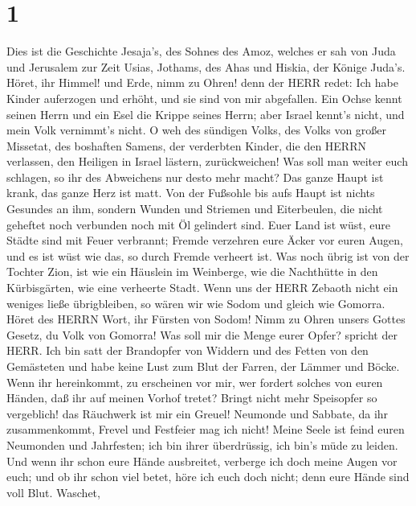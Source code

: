 \hypertarget{section}{%
\section{1}\label{section}}

 Dies ist die Geschichte Jesaja's, des Sohnes des Amoz,
welches er sah von Juda und Jerusalem zur Zeit Usias, Jothams, des Ahas
und Hiskia, der Könige Juda's.  Höret, ihr Himmel! und Erde,
nimm zu Ohren! denn der HERR redet: Ich habe Kinder auferzogen und
erhöht, und sie sind von mir abgefallen.  Ein Ochse kennt
seinen Herrn und ein Esel die Krippe seines Herrn; aber Israel kennt's
nicht, und mein Volk vernimmt's nicht.  O weh des sündigen
Volks, des Volks von großer Missetat, des boshaften Samens, der
verderbten Kinder, die den HERRN verlassen, den Heiligen in Israel
lästern, zurückweichen!  Was soll man weiter euch schlagen,
so ihr des Abweichens nur desto mehr macht? Das ganze Haupt ist krank,
das ganze Herz ist matt.  Von der Fußsohle bis aufs Haupt
ist nichts Gesundes an ihm, sondern Wunden und Striemen und Eiterbeulen,
die nicht geheftet noch verbunden noch mit Öl gelindert sind.
 Euer Land ist wüst, eure Städte sind mit Feuer verbrannt;
Fremde verzehren eure Äcker vor euren Augen, und es ist wüst wie das, so
durch Fremde verheert ist.  Was noch übrig ist von der
Tochter Zion, ist wie ein Häuslein im Weinberge, wie die Nachthütte in
den Kürbisgärten, wie eine verheerte Stadt.  Wenn uns der
HERR Zebaoth nicht ein weniges ließe übrigbleiben, so wären wir wie
Sodom und gleich wie Gomorra.  Höret des HERRN Wort, ihr
Fürsten von Sodom! Nimm zu Ohren unsers Gottes Gesetz, du Volk von
Gomorra!  Was soll mir die Menge eurer Opfer? spricht der
HERR. Ich bin satt der Brandopfer von Widdern und des Fetten von den
Gemästeten und habe keine Lust zum Blut der Farren, der Lämmer und
Böcke.  Wenn ihr hereinkommt, zu erscheinen vor mir, wer
fordert solches von euren Händen, daß ihr auf meinen Vorhof tretet?
 Bringt nicht mehr Speisopfer so vergeblich! das Räuchwerk
ist mir ein Greuel! Neumonde und Sabbate, da ihr zusammenkommt, Frevel
und Festfeier mag ich nicht!  Meine Seele ist feind euren
Neumonden und Jahrfesten; ich bin ihrer überdrüssig, ich bin's müde zu
leiden.  Und wenn ihr schon eure Hände ausbreitet, verberge
ich doch meine Augen vor euch; und ob ihr schon viel betet, höre ich
euch doch nicht; denn eure Hände sind voll Blut.  Waschet,
